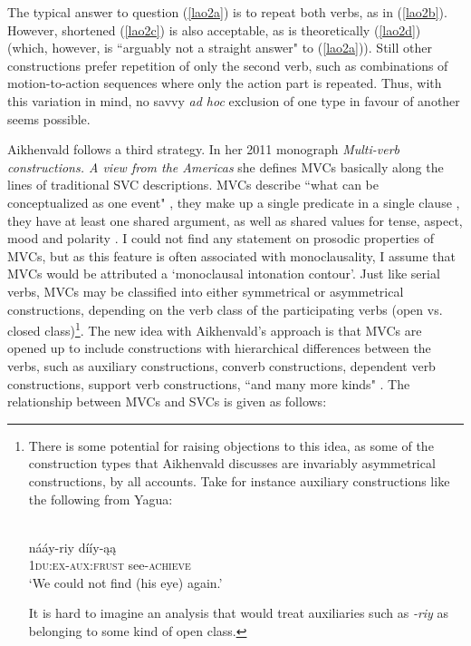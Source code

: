 The typical answer to question (\ref{lao2a}) is to repeat both verbs, as in (\ref{lao2b}). However, shortened (\ref{lao2c}) is also acceptable, as is theoretically (\ref{lao2d}) (which, however, is ``arguably not a straight answer" \citep[107]{enfield2008verbs} to (\ref{lao2a})). Still other constructions prefer  repetition of only the second verb, such as combinations of motion-to-action sequences where only the action part is repeated. Thus, with this variation in mind, no savvy \textit{ad hoc} exclusion of one type in favour of another seems possible.

Aikhenvald follows a third strategy. In her 2011 monograph \textit{Multi-verb constructions. A view from the Americas} she defines MVCs basically along the lines of traditional SVC descriptions. MVCs describe ``what can be conceptualized as one event" \citep[vii]{Aikhenvald2011}, they make up a single predicate in a single clause \citep[1]{Aikhenvald2011}, they have at least one shared argument, as well as shared values for tense, aspect, mood and polarity \citep[19]{Aikhenvald2011}. I could not find any statement on prosodic properties of MVCs, but as this feature is often associated with monoclausality, I assume that MVCs would be attributed a `monoclausal intonation contour'. Just like serial verbs, MVCs may be classified into either symmetrical or asymmetrical constructions, depending on the verb class of the participating verbs (open vs. closed class)\footnote{There is some potential for raising objections to this idea, as some of the construction types that Aikhenvald discusses are invariably asymmetrical constructions, by all accounts. Take for instance auxiliary constructions like the following from Yagua:

\ea \label{}
\\
\gll nááy-riy dííy-ąą \\
\textsc{1}\textsc{du}:\textsc{ex}-\textsc{aux}:\textsc{frust} see-\textsc{achieve} \\
\glft `We could not find (his eye) again.'\\ 
\z

It is hard to imagine an analysis that would treat auxiliaries such as \textit{-riy} as belonging to some kind of open class.}. The new idea with Aikhenvald's approach is that MVCs are opened up to include constructions with hierarchical differences between the verbs, such as auxiliary constructions, converb constructions, dependent verb constructions, support verb constructions, ``and many more kinds" \citealt[vii]{Aikhenvald2011}. The relationship between MVCs and SVCs is given as follows:


